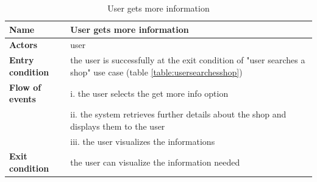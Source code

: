 \begin{table}[h!]
    \centering
    \begin{tabular}{@{}P{0.2\textwidth}P{0.70\textwidth}@{}}
        \toprule
        \textbf{Name}                 & User gets more information\\
        \midrule
        \textbf{Actors}               & user\\
        \textbf{Entry condition}      & the user is successfully at the exit condition of "user searches a shop" use case (table \ref{table:usersearchesshop})\\
        \textbf{Flow of events}            
        & i. the user selects the get more info option\\
        & ii. the system retrieves further details about the shop and displays them to the user\\
        & iii. the user visualizes the informations\\
        \textbf{Exit condition}       & the user can visualize the information needed\\
        \bottomrule
    \end{tabular}
\caption{User gets more information}
\label{table:usergetmoreinformation}
\end{table}

